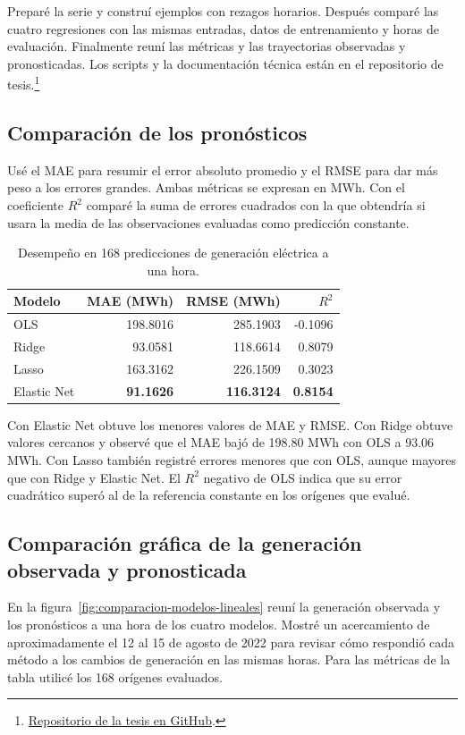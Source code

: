 \documentclass[11pt,letterpaper]{article}
\begin{document}
Preparé la serie y construí ejemplos con rezagos horarios. Después comparé las cuatro regresiones con las mismas entradas, datos de entrenamiento y horas de evaluación. Finalmente reuní las métricas y las trayectorias observadas y pronosticadas. Los scripts y la documentación técnica están en el repositorio de tesis.\footnote{\href{https://github.com/UlisesACC/Tesis_unam}{Repositorio de la tesis en GitHub}.}

\subsection{Comparación de los pronósticos}

Usé el MAE para resumir el error absoluto promedio y el RMSE para dar más peso a los errores grandes. Ambas métricas se expresan en MWh. Con el coeficiente $R^2$ comparé la suma de errores cuadrados con la que obtendría si usara la media de las observaciones evaluadas como predicción constante.

\begin{table}[htbp]
\centering
\caption{Desempeño en 168 predicciones de generación eléctrica a una hora.}
\begin{tabular}{lrrr}
\toprule
Modelo & MAE (MWh) & RMSE (MWh) & $R^2$ \\
\midrule
OLS & 198.8016 & 285.1903 & -0.1096 \\
Ridge & 93.0581 & 118.6614 & 0.8079 \\
Lasso & 163.3162 & 226.1509 & 0.3023 \\
Elastic Net & \textbf{91.1626} & \textbf{116.3124} & \textbf{0.8154} \\
\bottomrule
\end{tabular}
\end{table}

Con Elastic Net obtuve los menores valores de MAE y RMSE. Con Ridge obtuve valores cercanos y observé que el MAE bajó de 198.80 MWh con OLS a 93.06 MWh. Con Lasso también registré errores menores que con OLS, aunque mayores que con Ridge y Elastic Net. El $R^2$ negativo de OLS indica que su error cuadrático superó al de la referencia constante en los orígenes que evalué.

\subsection{Comparación gráfica de la generación observada y pronosticada}

En la figura~\ref{fig:comparacion-modelos-lineales} reuní la generación observada y los pronósticos a una hora de los cuatro modelos. Mostré un acercamiento de aproximadamente el 12 al 15 de agosto de 2022 para revisar cómo respondió cada método a los cambios de generación en las mismas horas. Para las métricas de la tabla utilicé los 168 orígenes evaluados.
\end{document}
